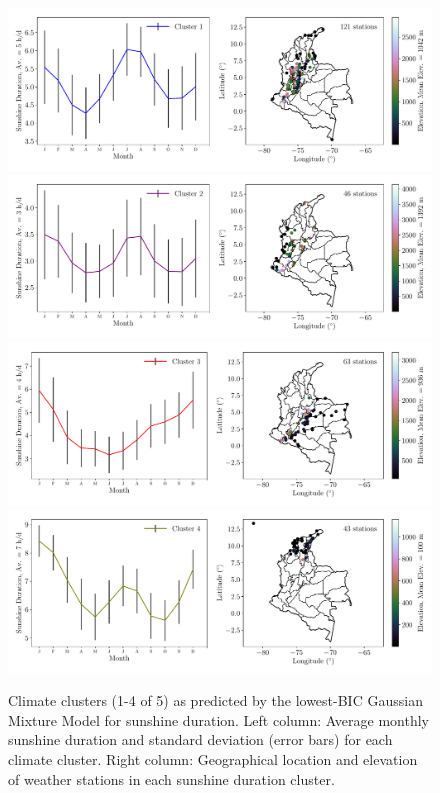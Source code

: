 \documentclass[a4paper,fleqn,usenatbib]{mnras}
\begin{document}
\begin{figure}
\begin{center}
\includegraphics[scale=0.5,trim={0 17 0 18},clip]{gmmb0.pdf}
\includegraphics[scale=0.5,trim={0 17 0 18},clip]{gmmb1.pdf}
\includegraphics[scale=0.5,trim={0 17 0 18},clip]{gmmb2.pdf}
\includegraphics[scale=0.5,trim={0 17 0 18},clip]{gmmb3.pdf}
\caption{Climate clusters (1-4 of 5) as predicted by the lowest-BIC Gaussian Mixture Model for sunshine duration. Left column: Average monthly sunshine duration and standard deviation (error bars) for each climate cluster. Right column: Geographical location and elevation of weather stations in each sunshine duration cluster.}\label{clustb1}
\end{center}
\end{figure}
\end{document}

